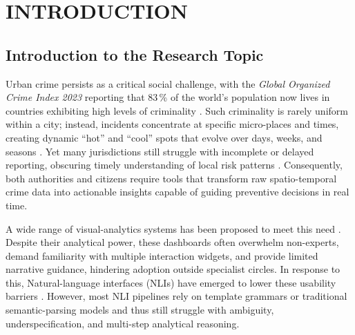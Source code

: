 \chapter{INTRODUCTION} 


\section{Introduction to the Research Topic} %

Urban crime persists as a critical social challenge, with the \emph{Global Organized Crime Index 2023} reporting that 83\,\% of the world’s population now lives in countries exhibiting high levels of criminality \cite{GlobalCrimeIndex2023}. %
Such criminality is rarely uniform within a city; instead, incidents concentrate at specific micro-places and times, creating dynamic “hot” and “cool” spots that evolve over days, weeks, and seasons \cite{Garcia2022CriPAV}.
Yet many jurisdictions still struggle with incomplete or delayed reporting, obscuring timely understanding of local risk patterns \cite{NSSFCrimeReporting2023}. Consequently, both authorities and citizens require tools that transform raw spatio-temporal crime data into actionable insights capable of guiding preventive decisions in real time.


A wide range of visual-analytics systems has been proposed to meet this need \cite{Garcia2022CriPAV, Salah2022BigCDVis, Silva2017CrimeVisAI, Garcia2020MiranteAV, Garcia2021CrimAnalyzer}. Despite their analytical power, these dashboards often overwhelm non-experts, demand familiarity with multiple interaction widgets, and provide limited narrative guidance, hindering adoption outside specialist circles. In response to this, Natural-language interfaces (NLIs) have emerged to lower these usability barriers \cite{Setlur2016Eviza, Narechania2021NL4DV, Luo2022NL2Vis, Liu2021ADVISor, Sah2024GeneratingAnalyticsDataVizLLMs}. However, most NLI pipelines rely on template grammars or traditional semantic-parsing models and thus still struggle with ambiguity, underspecification, and multi-step analytical reasoning.
 

